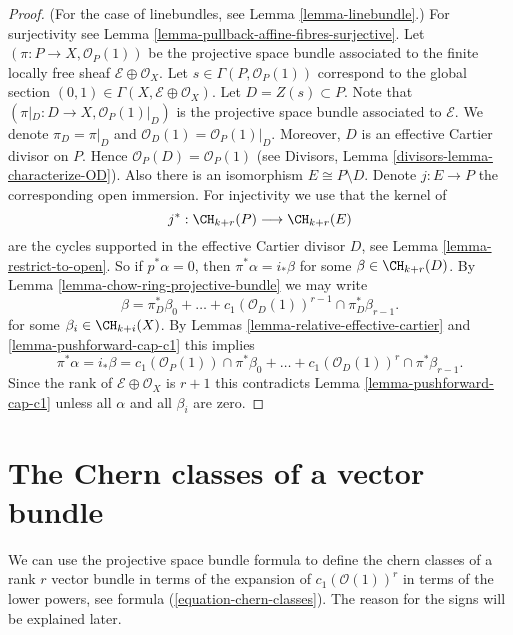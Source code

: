 \begin{proof}
(For the case of linebundles, see Lemma \ref{lemma-linebundle}.)
For surjectivity see Lemma \ref{lemma-pullback-affine-fibres-surjective}.
Let $(\pi  : P \to X, \mathcal{O}_P(1))$
be the projective space bundle associated
to the finite locally free sheaf $\mathcal{E} \oplus \mathcal{O}_X$.
Let $s \in \Gamma(P, \mathcal{O}_P(1))$ correspond to the global
section $(0, 1) \in \Gamma(X, \mathcal{E} \oplus \mathcal{O}_X)$.
Let $D = Z(s) \subset P$. Note that
$(\pi|_D : D \to X , \mathcal{O}_P(1)|_D)$
is the projective space bundle associated
to $\mathcal{E}$. We denote $\pi_D = \pi|_D$ and
$\mathcal{O}_D(1) = \mathcal{O}_P(1)|_D$.
Moreover, $D$ is an effective
Cartier divisor on $P$. Hence $\mathcal{O}_P(D) = \mathcal{O}_P(1)$
(see Divisors, Lemma \ref{divisors-lemma-characterize-OD}).
Also there is an isomorphism
$E \cong P \setminus D$. Denote $j : E \to P$ the
corresponding open immersion.
For injectivity we use that the kernel of
$$
j^* :
\CH_{k + r}(P)
\longrightarrow
\CH_{k + r}(E)
$$
are the cycles supported in the effective Cartier divisor $D$,
see Lemma \ref{lemma-restrict-to-open}. So if $p^*\alpha = 0$, then
$\pi^*\alpha = i_*\beta$ for some $\beta \in \CH_{k + r}(D)$.
By Lemma \ref{lemma-chow-ring-projective-bundle} we may write
$$
\beta = \pi_D^*\beta_0 +
\ldots + c_1(\mathcal{O}_D(1))^{r - 1} \cap \pi_D^* \beta_{r - 1}.
$$
for some $\beta_i \in \CH_{k + i}(X)$.
By Lemmas \ref{lemma-relative-effective-cartier}
and \ref{lemma-pushforward-cap-c1}
this implies
$$
\pi^*\alpha = i_*\beta =
c_1(\mathcal{O}_P(1)) \cap \pi^*\beta_0 +
\ldots +
c_1(\mathcal{O}_D(1))^r \cap \pi^*\beta_{r - 1}.
$$
Since the rank of $\mathcal{E} \oplus \mathcal{O}_X$ is $r + 1$
this contradicts Lemma \ref{lemma-pushforward-cap-c1} unless all
$\alpha$ and all $\beta_i$ are zero.
\end{proof}








\section{The Chern classes of a vector bundle}
\label{section-chern-classes-vector-bundles}

\noindent
We can use the projective space bundle formula to define the
chern classes of a rank $r$ vector bundle in terms of the expansion
of $c_1(\mathcal{O}(1))^r$ in terms of the lower powers, see
formula (\ref{equation-chern-classes}).
The reason for the signs will be explained later.

